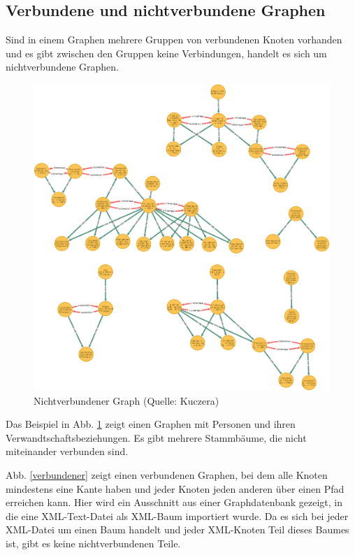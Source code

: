 \documentclass[ngerman,]{scrreprt}
\begin{document}
\hypertarget{verbundene-und-nichtverbundene-graphen}{%
\subsection{Verbundene und nichtverbundene Graphen}\label{verbundene-und-nichtverbundene-graphen}}

Sind in einem Graphen mehrere Gruppen von verbundenen Knoten vorhanden und es gibt zwischen den Gruppen keine Verbindungen, handelt es sich um nichtverbundene Graphen.

\begin{figure}
\centering
\includegraphics{Bilder/disconnectedGraph.png}
\caption{Nichtverbundener Graph (Quelle: Kuczera)}
\label{nichtverbundener}
\end{figure}

Das Beispiel in Abb. \ref{nichtverbundener} zeigt einen Graphen mit Personen und ihren Verwandtschaftsbeziehungen. Es gibt mehrere Stammbäume, die nicht miteinander verbunden sind.

Abb. \ref{verbundener} zeigt einen verbundenen Graphen, bei dem alle Knoten mindestens eine Kante haben und jeder Knoten jeden anderen über einen Pfad erreichen kann. Hier wird ein Ausschnitt aus einer Graphdatenbank gezeigt, in die eine XML-Text-Datei als XML-Baum importiert wurde. Da es sich bei jeder XML-Datei um einen Baum handelt und jeder XML-Knoten Teil dieses Baumes ist, gibt es keine nichtverbundenen Teile.
\end{document}
